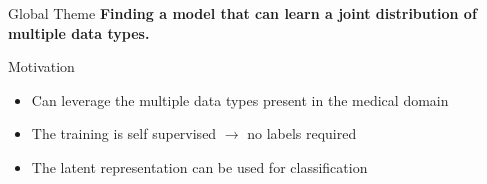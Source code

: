 \begin{frame}
        \titlepage
    \end{frame}

    \begin{frame}{Global Theme}
        \centering
        \textbf{Finding a model that can learn a joint distribution of multiple data types.}

        \begin{figure}
        \end{figure}
    \end{frame}

    \begin{frame}{Motivation}
        \begin{itemize}
            \item Can leverage the multiple data types present in the medical domain
            \item The training is self supervised $\rightarrow$ no labels required
            \item The latent representation can be used for classification
        \end{itemize}
    \end{frame}


